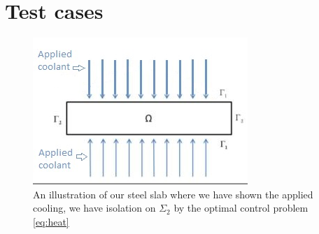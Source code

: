 \section{Test cases}
\begin{figure}
    \centering
    \includegraphics{figures/steel_slab_visualization.jpg}
    \caption{An illustration of our steel slab where we have shown the applied cooling, we have isolation on $\Sigma_2$ by the optimal control problem \eqref{eq:heat}}
    \label{fig:steel_slab}
\end{figure}